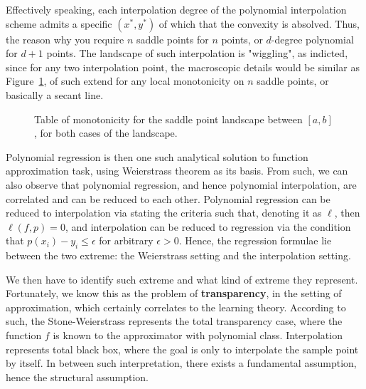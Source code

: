Effectively speaking, each interpolation degree of the polynomial interpolation scheme admits a specific $(x^{*},y^{*})$ of which that the convexity is absolved. Thus, the reason why you require $n$ saddle points for $n$ points, or $d$-degree polynomial for $d+1$ points. The landscape of such interpolation is "wiggling", as indicted, since for any two interpolation point, the macroscopic details would be similar as Figure~\ref{fig:monotonicity_test}, of such extend for any local monotonicity on $n$ saddle points, or basically a secant line. 

\begin{figure}[htb]
    \centering
\caption{\small Table of monotonicity for the saddle point landscape between $[a,b]$, for both cases of the landscape.}
\label{fig:monotonicity_test}
\end{figure}

Polynomial regression is then one such analytical solution to function approximation task, using Weierstrass theorem as its basis. From such, we can also observe that polynomial regression, and hence polynomial interpolation, are correlated and can be reduced to each other. Polynomial regression can be reduced to interpolation via stating the criteria such that, denoting it as $\ell$, then $\ell(f,p)=0$, and interpolation can be reduced to regression via the condition that $p(x_{i})-y_{i}\leq \epsilon$ for arbitrary $\epsilon>0$. Hence, the regression formulae lie between the two extreme: the Weierstrass setting and the interpolation setting. 

We then have to identify such extreme and what kind of extreme they represent. Fortunately, we know this as the problem of \textbf{transparency}, in the setting of approximation, which certainly correlates to the learning theory. According to such, the Stone-Weierstrass represents the total transparency case, where the function $f$ is known to the approximator with polynomial class. Interpolation represents total black box, where the goal is only to interpolate the sample point by itself. In between such interpretation, there exists a fundamental assumption, hence the structural assumption. 

